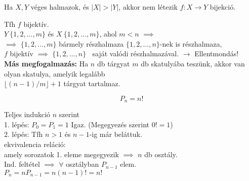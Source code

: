 \documentclass{beamer}
\begin{document}
\begin{frame}

\begin{tcolorbox}[title={Tétel: Skatulya-elv}]
Ha $X, Y$ véges halmazok, és $|X| > |Y|$, akkor nem létezik $f: X \rightarrow Y$ bijekció.

\end{tcolorbox}

\begin{tcolorbox}[title={Bizonyítás (Indirekt)}]
Tfh $f$ bijektív.\\
$Y ~ \{1, 2, ..., m\}$ és $X ~ \{1, 2, ..., m\}$, ahol $m < n$ $\implies$\\
$\implies$ $\{1, 2, ..., m\}$ bármely részhalmaza $\{1, 2, ..., n\}$-nek is részhalmaza,\\
$f$ bijektív $\implies$ $\{1, 2, ..., n\}$ $~$ saját valódi részhalmazával. $\rightarrow$ Ellentmondás!\\
\bigskip
\textbf{Más megfogalmazás:} Ha $n$ db tárgyat $m$ db skatulyába teszünk, akkor van olyan skatulya, amelyik legalább\\
$\lfloor (n - 1) / m \rfloor + 1$ tárgyat tartalmaz.

\end{tcolorbox}

\end{frame}

\begin{frame}

\begin{tcolorbox}[title={Tétel: Permutációk száma}]
$$P_n = n!$$

\end{tcolorbox}

\begin{tcolorbox}[title={Bizonyítás}]
Teljes indukció $n$ szerint\\
1. lépés: $P_0 = P_1 = 1$ Igaz. (Megegyezés szerint $0! = 1$)\\
2. lépés: Tfh $n > 1$ és $n - 1$-ig már beláttuk.\\
ekvivalencia reláció:\\
amely sorozatok 1. eleme megegyezik $\implies$ $n$ db osztály.\\
Ind. feltétel $\implies$ $\forall$ osztályban $P_{n - 1}$ elem.\\
$P_n = nP_{n - 1} = n(n - 1)! = n!$

\end{tcolorbox}

\end{frame}
\end{document}
